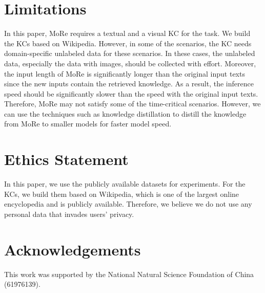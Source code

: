 \documentclass[11pt]{article}
\begin{document}
\section*{Limitations}
In this paper, MoRe requires a textual and a visual KC for the task. We build the KCs based on Wikipedia. However, in some of the scenarios, the KC needs domain-specific unlabeled data for these scenarios. In these cases, the unlabeled data, especially the data with images, should be collected with effort. Moreover, the input length of MoRe is significantly longer than the original input texts since the new inputs contain the retrieved knowledge. As a result, the inference speed should be significantly slower than the speed with the original input texts. Therefore, MoRe may not satisfy some of the time-critical scenarios. However, we can use the techniques such as knowledge distillation \citep{44873} to distill the knowledge from MoRe to smaller models for faster model speed.

\section*{Ethics Statement}
In this paper, we use the publicly available datasets for experiments. For the KCs, we build them based on Wikipedia, which is one of the largest online encyclopedia and is publicly available. Therefore, we believe we do not use any personal data that invades users' privacy.

\section*{Acknowledgements}
This work was supported by the National Natural Science Foundation of China (61976139).



\end{document}
